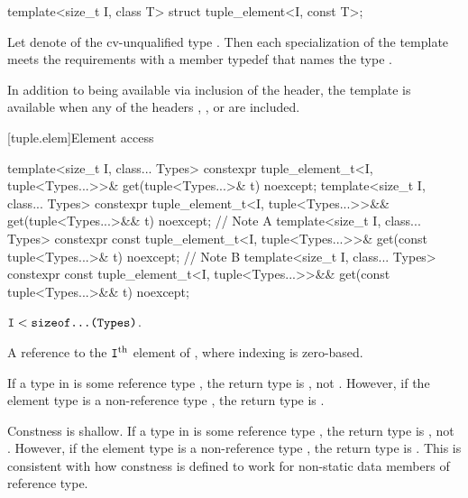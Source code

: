 %
\begin{itemdecl}
template<size_t I, class T> struct tuple_element<I, const T>;
\end{itemdecl}

\begin{itemdescr}
\pnum
Let  denote  of the cv-unqualified type . Then
each specialization of the template meets the  requirements
with a member typedef  that names the type .

\pnum
In addition to being available via inclusion of the  header,
the template is available
when any of the headers
,
, or
are included.
\end{itemdescr}

[tuple.elem]{Element access}

%
\begin{itemdecl}
template<size_t I, class... Types>
  constexpr tuple_element_t<I, tuple<Types...>>&
    get(tuple<Types...>& t) noexcept;
template<size_t I, class... Types>
  constexpr tuple_element_t<I, tuple<Types...>>&&
    get(tuple<Types...>&& t) noexcept;        // Note A
template<size_t I, class... Types>
  constexpr const tuple_element_t<I, tuple<Types...>>&
    get(const tuple<Types...>& t) noexcept;   // Note B
template<size_t I, class... Types>
  constexpr const tuple_element_t<I, tuple<Types...>>&& get(const tuple<Types...>&& t) noexcept;
\end{itemdecl}

\begin{itemdescr}
\pnum
\mandates
$\texttt{I} < \texttt{sizeof...(Types)}$.

\pnum
\returns
A reference to the $\texttt{I}^\text{th}$ element of , where
indexing is zero-based.

\pnum
\begin{note}
[Note A]
If a type  in  is some reference type ,
the return type is , not .
However, if the element type is a non-reference type ,
the return type is .
\end{note}

\pnum
\begin{note}
[Note B]
Constness is shallow.
If a type  in  is some reference type ,
the return type is , not .
However, if the element type is a non-reference type ,
the return type is .
This is consistent with how constness is defined to work
for non-static data members of reference type.
\end{note}
\end{itemdescr}

